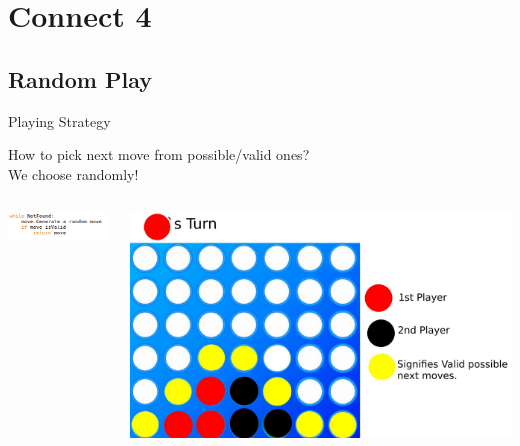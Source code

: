 \documentclass{beamer}
\begin{document}
\section{Connect 4}

\subsection{Random Play}
\begin{frame}{Playing Strategy}

How to pick next move from possible/valid ones? \\
We choose randomly! 
\begin{columns}
	 	\begin{column}{0.5\textwidth}
			\centering
			\includegraphics[scale = .705]{random_algo.png}
	 	\end{column}
 		\begin{column}{0.5\textwidth}
			\centering
			\includegraphics[scale = 0.09]{valid.jpeg}	
	 	\end{column}
	 \end{columns}
\end{frame}
\end{document}
